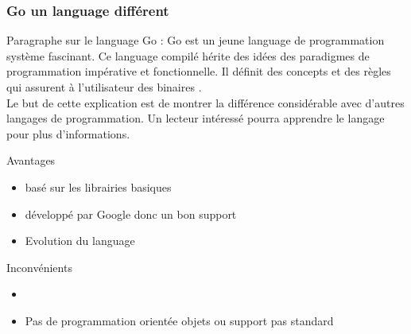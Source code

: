         
       

        \subsubsection{Go un language différent}
       
        Paragraphe sur le language Go : 
        Go est un jeune language de programmation système
        fascinant. Ce language compilé hérite des idées des paradigmes de
        programmation impérative et fonctionnelle. Il définit des concepts et
        des règles qui assurent à l'utilisateur des binaires .\\[0.3cm]
       
      
        Le but de cette explication est de montrer la différence considérable
        avec d'autres langages de programmation. Un lecteur intéressé pourra
        apprendre le langage pour plus d'informations.

        {Avantages}
            \begin{itemize}
                \renewcommand{\labelitemi}{$\bullet$}
                \item basé sur les librairies basiques
                \item développé par Google donc un bon support 
                \item Evolution du language
            \end{itemize}

        {Inconvénients}
            \begin{itemize}
                \renewcommand{\labelitemi}{$\bullet$}
                \item 
                \item Pas de programmation orientée objets ou support pas standard
            \end{itemize}

